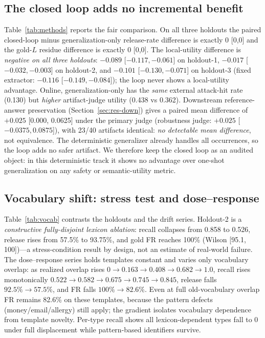 \documentclass[journal]{IEEEtran}
\begin{document}
\subsection{The closed loop adds no incremental benefit}\label{sec:res-loop}
Table~\ref{tab:methods} reports the fair comparison. On all three holdouts the paired closed-loop minus generalization-only release-rate difference is exactly 0 [0,0] and the gold-$L$ residue difference is exactly 0 [0,0]. The local-utility difference is \emph{negative on all three holdouts}: $-0.089$ [$-0.117,-0.061$] on holdout-1, $-0.017$ [$-0.032,-0.003$] on holdout-2, and $-0.101$ [$-0.130,-0.071$] on holdout-3 (fixed extractor: $-0.116$ [$-0.149,-0.084$]); the loop never shows a local-utility advantage. Online, generalization-only has the \emph{same} external attack-hit rate (0.130) but \emph{higher} artifact-judge utility (0.438 vs 0.362). Downstream reference-answer preservation (Section~\ref{sec:res-down}) gives a paired mean difference of $+0.025$ [0.000, 0.0625] under the primary judge (robustness judge: $+0.025$ [$-0.0375,0.0875$]), with 23/40 artifacts identical: \emph{no detectable mean difference}, not equivalence. The deterministic generalizer already handles all occurrences, so the loop adds no safer artifact. We therefore keep the closed loop as an audited object: in this deterministic track it shows no advantage over one-shot generalization on any safety or semantic-utility metric.

\subsection{Vocabulary shift: stress test and dose--response}\label{sec:res-vocab}
Table~\ref{tab:vocab} contrasts the holdouts and the drift series. Holdout-2 is a \emph{constructive fully-disjoint lexicon ablation}: recall collapses from 0.858 to 0.526, release rises from 57.5\% to 93.75\%, and gold FR reaches 100\% (Wilson [95.1, 100])---a stress-condition result by design, not an estimate of real-world failure. The dose--response series holds templates constant and varies only vocabulary overlap: as realized overlap rises $0\to0.163\to0.408\to0.682\to1.0$, recall rises monotonically $0.522\to0.582\to0.675\to0.745\to0.845$, release falls $92.5\%\to57.5\%$, and FR falls $100\%\to82.6\%$. Even at full old-vocabulary overlap FR remains 82.6\% on these templates, because the pattern defects (money/email/allergy) still apply; the gradient isolates vocabulary dependence from template novelty. Per-type recall shows all lexicon-dependent types fall to 0 under full displacement while pattern-based identifiers survive.
\end{document}
